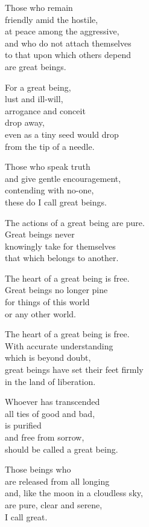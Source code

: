 Those who remain\\
friendly amid the hostile,\\
at peace among the aggressive,\\
and who do not attach themselves\\
to that upon which others depend\\
are great beings.


For a great being,\\
lust and ill-will,\\
arrogance and conceit\\
drop away,\\
even as a tiny seed would drop\\
from the tip of a needle.


Those who speak truth\\
and give gentle encouragement,\\
contending with no-one,\\
these do I call great beings.


The actions of a great being are pure.\\
Great beings never\\
knowingly take for themselves\\
that which belongs to another.

The heart of a great being is free.\\
Great beings no longer pine\\
for things of this world\\
or any other world.


The heart of a great being is free.\\
With accurate understanding\\
which is beyond doubt,\\
great beings have set their feet firmly\\
in the land of liberation.


Whoever has transcended\\
all ties of good and bad,\\
is purified\\
and free from sorrow,\\
should be called a great being.


Those beings who\\
are released from all longing\\
and, like the moon in a cloudless sky,\\
are pure, clear and serene,\\
I call great.



